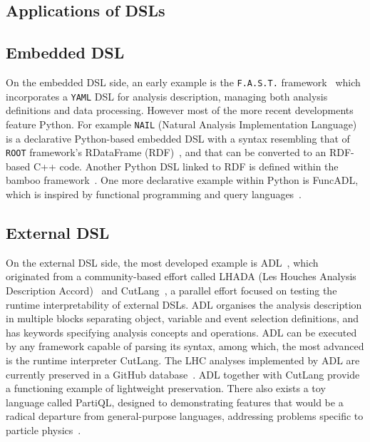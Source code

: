 \documentclass[11pt]{article}
\begin{document}
\def\thefootnote{\fnsymbol{footnote}}
\setcounter{footnote}{0}

\clearpage
{}



\clearpage
\printglossaries

\clearpage
\begin{appendices}

    \section{Applications of DSLs}
    \label{app:dsl}
    \subsection{Embedded DSL}
    On the embedded \gls{DSL} side, an early example is the \texttt{F.A.S.T.} framework~\cite{FAST} which incorporates a \texttt{YAML} \gls{DSL} for analysis description, managing both analysis definitions and data processing.
    However most of the more recent developments feature Python.
    For example \texttt{NAIL} (Natural Analysis Implementation Language)~\cite{NAIL} is a declarative Python-based embedded \gls{DSL} with a syntax resembling that of \texttt{ROOT} framework's RDataFrame (RDF)~\cite{enrico_guiraud_2017_260230}, and that can be converted to an RDF-based C++ code.
    Another Python \gls{DSL} linked to RDF is defined within the bamboo framework~\cite{David:2021ohq}.
    One more declarative example within Python is FuncADL, which is inspired by functional programming and query languages~\cite{Proffitt:2021wfh}.

    \subsection{External DSL}
    On the external \gls{DSL} side, the most developed example is \gls{ADL}~\cite{adlweb, Unel:2021edl}, which originated from a community-based effort called LHADA (Les Houches Analysis Description Accord)~\cite{Brooijmans:2016vro} and CutLang~\cite{Sekmen:2018ehb}, a parallel effort focused on testing the runtime interpretability of external \glspl{DSL}.
    \gls{ADL} organises the analysis description in multiple blocks separating object, variable and event selection definitions, and has keywords specifying analysis concepts and operations.
    \gls{ADL} can be executed by any framework capable of parsing its syntax, among which, the most advanced is the runtime interpreter CutLang. The \gls{LHC} analyses implemented by \gls{ADL} are currently preserved in a GitHub database~\cite{adllhcanl}.
    \gls{ADL} together with CutLang provide a functioning example of lightweight preservation. There also exists a toy language called PartiQL, designed to demonstrating features that would be a radical departure from general-purpose languages, addressing problems specific to particle physics~\cite{PartiQL}.


\end{appendices}
\end{document}
